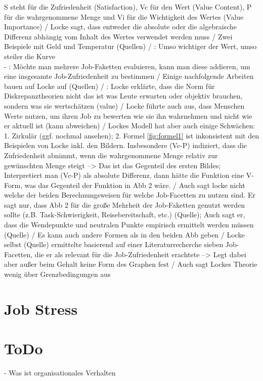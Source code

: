 S steht für die Zufriedenheit (Satisfaction),  Vc für den Wert (Value Content), P für die wahrgenommene Menge und Vi für die Wichtigkeit des Wertes (Value Importance) / Locke sagt, dass entweder die absolute oder die algebraische Differenz abhängig vom Inhalt des Wertes verwendet werden muss / Zwei Beispiele mit Geld und Temperatur (Quellen) / \cite[S. 14]{edwards:2008}: Umso wichtiger der Wert, umso steiler die Kurve \\
- \cite[S. 14]{edwards:2008}: Möchte man mehrere Job-Faketten evaluieren, kann man diese addieren, um eine insgesamte Job-Zufriedenheit zu bestimmen / Einige nachfolgende Arbeiten bauen auf Locke auf (Quellen) / \cite[S. 15]{edwards:2008}: Locke erklärte, dass die Norm für Diskrepanztheorien nicht das ist was Leute erwarten oder objektiv brauchen, sondern was sie wertschätzen (value) / Locke führte auch aus, dass Menschen Werte nutzen, um ihren Job zu bewerten wie sie ihn wahrnehmen und nicht wie er aktuell ist (kann abweichen) / Lockes Modell hat aber auch einige Schwächen: 1. Zirkulär (ggf. nochmal ansehen); 2. Formel \ref{fig:formel1} ist inkonsistent mit den Beispielen von Locke inkl. den Bildern. Insbesondere (Vc-P) indiziert, dass die Zufriedenheit abnimmt, wenn die wahrgenommene Menge relativ zur gewünschten Menge steigt --> Das ist das Gegenteil des ersten Bildes; Interpretiert man (Vc-P) als absolute Differenz, dann hätte die Funktion eine V-Form, was das Gegenteil der Funktion in Abb 2 wäre. / Auch sagt locke nicht welche der beiden Berechnungsweisen für welche Job-Facetten zu nutzen sind. Er sagt nur, dass Abb 2 für die große Mehrheit der Job-Faketten genutzt werden sollte (z.B. Task-Schwierigkeit, Reisebereitschaft, etc.) (Quelle); Auch sagt er, dass die Wendepunkte und neutralen Punkte empirisch ermittelt werden müssen (Quelle) / Es kann auch andere Formen als in den beiden Abb geben / Locke selbst (Quelle) ermittelte basierend auf einer Literaturrecherche sieben Job-Facetten, die er als relevant für die Job-Zufriedenheit erachtete --> Legt dabei aber außer beim Gehalt keine Form des Graphen fest / Auch sagt Lockes Theorie wenig über Grenzbedingungen aus

\section{Job Stress}
\label{ch:notizen:jobStress}


\section{ToDo}
\label{ch:todo}
- Was ist organisationales Verhalten \\
